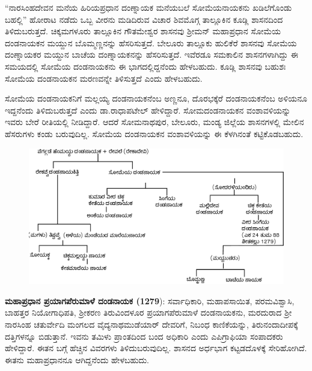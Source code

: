 \vskip 2pt

“ನಾರಸಿಂಹದೇವನ ಮನೆಯ ಹಿರಿಯಪ್ರಧಾನ ದಂಣ್ನಾಯಕ ಮನೆಯಬಲೆ ಸೋಮೆಯನಾಯಕನು ಖಡಿಲೆಗೊಂಡು ಬಹಲ್ಲಿ” ಹೋರಾಟ ನಡೆದು ಒಬ್ಬ ವೀರನು ಮಡಿದಿರುವ ವಿಚಾರ ಶಿವಮೊಗ್ಗ ತಾಲ್ಲೂಕಿನ ಕೂಡ್ಲಿ ಶಾಸನದಿಂದ ತಿಳಿದುಬರುತ್ತದೆ. ಚಿಕ್ಕಮಗಳೂರು ತಾಲ್ಲೂಕಿನ ಗೌತಮೇಶ್ವರ ಶಾಸನವು ಶ‍್ರೀಮನ್​ ಮಹಾಪ್ರಧಾನ ಸೋಮೆಯ ದಂಡನಾಯಕನ ಮಯ್ದುನ ಬೊಮ್ಮಣ್ಣನನ್ನು ಹೆಸರಿಸುತ್ತದೆ. ಬೇಲೂರು ತಾಲ್ಲೂಕು ಹುಲಿಕೆರೆ ಶಾಸನವು ಸೋಮೆಯ ದಂಣ್ನಾಯಕರ ಮಯ್ದುನ ಬಾಚೆಯ ದಂಣ್ನಾಯಕನನ್ನು ಹೆಸರಿಸುತ್ತದೆ. ಇವೆರಡೂ ಸಮಕಾಲಿನ ಶಾಸನಗಳಾಗಿದ್ದು ಈ ಸಮಯದಲ್ಲಿ ಸೋಮೆಯ ದಂಡನಾಯಕನು ಈ ಭಾಗದಲ್ಲಿದ್ದನೆಂದು ಹೇಳಬಹುದು. ಕೂಡ್ಲಿ ಶಾಸನವು ಬಹುಶಃ ಸೋಮೆಯ ದಂಡನಾಯಕನ ಮರಣವನ್ನೇ ತಿಳಿಸುತ್ತದೆ ಎಂದು ಹೇಳಬಹುದು.

\vskip 2pt

ಸೋಮೆಯ ದಂಡನಾಯಕನಿಗೆ ಮಲ್ಲಯ್ಯ ದಂಡನಾಯಕನೆಂಬ ಅಣ್ಣನೂ, ದೊರಭಕ್ಕೆರೆ ದಂಡನಾಯಕನೆಂಬ ಅಳಿಯನೂ ಇದ್ದನೆಂದು ತಿಳಿದುಬರುತ್ತದೆ ಎಂದು ಡಾ.ರಾಧಾಪಟೇಲ್​ ಹೇಳಿದ್ದಾರೆ. ಸೋಮದಂಡನಾಯಕನ ವಂಶಾವಳಿಯನ್ನು ಇವರು ಬೇರೆ ರೀತಿಯಲ್ಲಿ ನೀಡಿದ್ದಾರೆ. ಆದರೆ ಸೋಮನಾಥಪುರ, ಬೇಲೂರು, ಮಂಡ್ಯ ಜಿಲ್ಲೆಯ ಶಾಸನಗಳಲ್ಲಿ ಮೇಲಿನ ಹೆಸರುಗಳು ಕಂಡು ಬರುವುದಿಲ್ಲ. ಸೋಮೆಯ ದಂಡನಾಯಕನ ವಂಶಾವಳಿಯನ್ನು ಈ ಕೆಳಗಿನಂತೆ ಕಟ್ಟಿಕೊಡಬಹುದು.

\begin{figure}[H]
\includegraphics[scale=.8]{images/chap3/chap3fig21.jpeg}
\end{figure}

\textbf{ಮಹಾಪ್ರಧಾನ ಪ್ರಯಾಗಪೆರುಮಾಳೆ ದಂಡನಾಯಕ (1279}): ಸರ್ವಾಧಿಕಾರಿ, ಮಹಾಪಸಾಯಿತ, ಪರಮವಿಶ್ವಾಸಿ, ಬಾಹತ್ತರ ನಿಯೋಗಾಧಿಪತಿ, ಶ‍್ರೀಕರಣ ತಿರುವಿಂದಳೂರ ಪ್ರಯಾಗಪೆರುಮಾಳೆ ದಂಡನಾಯಕನು, ಮರದುರಾದ ಶ‍್ರೀ ನಾರಸಿಂಹ ಚತುರ್ವೇದಿ ಮಂಗಲದ ವೈದ್ಯನಾಥಮುಡೆಯಾರ್​ ದೇವರಿಗೆ, ನಿಬಂಧ ಕಾಣಿಕೆಯನ್ನು, ತಿರುನಂದಾದೀಪಕ್ಕೆ ದತ್ತಿಗಳನ್ನೂ ಬಿಡುತ್ತಾನೆ. ಇವನು ತಮಿಳು ಪ್ರಾಂತದಿಂದ ಬಂದ ಅಧಿಕಾರಿ ಎಂದು ಎಪಿಗ್ರಾಫಿಯಾ ಸಂಪಾದಕರು ಹೇಳಿದ್ದಾರೆ. ಈತನ ಬಗ್ಗೆ ಹೆಚ್ಚಿನ ವಿವರಗಳು ತಿಳಿದುಬರುವುದಿಲ್ಲ. ಶಾಸನದ ಅರ್ಧಭಾಗ ಕಟ್ಟಡದೊಳಕ್ಕೆ ಸೇರಿಹೋಗಿದೆ. ಈತನು ಮಹಾಪ್ರಧಾನನೂ ಆಗಿದ್ದನೆಂದು ಹೇಳಬಹುದು.

